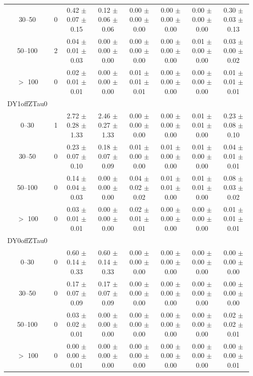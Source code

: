 \begin{table}[htp]
\begin{center}
\begin{tabular}{|c|c|c|ccccc|}
30--50 & 0 & 0.42 $\pm$ 0.07 $\pm$ 0.15 & 0.12 $\pm$ 0.06 $\pm$ 0.06 & 0.00 $\pm$ 0.00 $\pm$ 0.00 & 0.00 $\pm$ 0.00 $\pm$ 0.00 & 0.00 $\pm$ 0.00 $\pm$ 0.00 & 0.30 $\pm$ 0.03 $\pm$ 0.13 \\
50--100 & 2 & 0.04 $\pm$ 0.01 $\pm$ 0.03 & 0.00 $\pm$ 0.00 $\pm$ 0.00 & 0.00 $\pm$ 0.00 $\pm$ 0.00 & 0.00 $\pm$ 0.00 $\pm$ 0.00 & 0.01 $\pm$ 0.00 $\pm$ 0.00 & 0.03 $\pm$ 0.00 $\pm$ 0.02 \\
$>$ 100 & 0 & 0.02 $\pm$ 0.01 $\pm$ 0.01 & 0.00 $\pm$ 0.00 $\pm$ 0.00 & 0.01 $\pm$ 0.01 $\pm$ 0.01 & 0.00 $\pm$ 0.00 $\pm$ 0.00 & 0.00 $\pm$ 0.00 $\pm$ 0.00 & 0.01 $\pm$ 0.01 $\pm$ 0.01 \\
\hline
DY1offZTau0\\
\hline
0--30 & 1 & 2.72 $\pm$ 0.28 $\pm$ 1.33 & 2.46 $\pm$ 0.27 $\pm$ 1.33 & 0.00 $\pm$ 0.00 $\pm$ 0.00 & 0.00 $\pm$ 0.00 $\pm$ 0.00 & 0.01 $\pm$ 0.01 $\pm$ 0.00 & 0.23 $\pm$ 0.08 $\pm$ 0.10 \\
30--50 & 0 & 0.23 $\pm$ 0.07 $\pm$ 0.10 & 0.18 $\pm$ 0.07 $\pm$ 0.09 & 0.01 $\pm$ 0.00 $\pm$ 0.00 & 0.01 $\pm$ 0.00 $\pm$ 0.00 & 0.01 $\pm$ 0.00 $\pm$ 0.00 & 0.04 $\pm$ 0.01 $\pm$ 0.01 \\
50--100 & 0 & 0.14 $\pm$ 0.04 $\pm$ 0.03 & 0.00 $\pm$ 0.00 $\pm$ 0.00 & 0.04 $\pm$ 0.02 $\pm$ 0.02 & 0.01 $\pm$ 0.01 $\pm$ 0.00 & 0.01 $\pm$ 0.01 $\pm$ 0.00 & 0.08 $\pm$ 0.03 $\pm$ 0.02 \\
$>$ 100 & 0 & 0.03 $\pm$ 0.01 $\pm$ 0.01 & 0.00 $\pm$ 0.00 $\pm$ 0.00 & 0.02 $\pm$ 0.01 $\pm$ 0.01 & 0.00 $\pm$ 0.00 $\pm$ 0.00 & 0.00 $\pm$ 0.00 $\pm$ 0.00 & 0.01 $\pm$ 0.01 $\pm$ 0.01 \\
\hline
DY0offZTau0\\
\hline
0--30 & 0 & 0.60 $\pm$ 0.14 $\pm$ 0.33 & 0.60 $\pm$ 0.14 $\pm$ 0.33 & 0.00 $\pm$ 0.00 $\pm$ 0.00 & 0.00 $\pm$ 0.00 $\pm$ 0.00 & 0.00 $\pm$ 0.00 $\pm$ 0.00 & 0.00 $\pm$ 0.00 $\pm$ 0.00 \\
30--50 & 0 & 0.17 $\pm$ 0.07 $\pm$ 0.09 & 0.17 $\pm$ 0.07 $\pm$ 0.09 & 0.00 $\pm$ 0.00 $\pm$ 0.00 & 0.00 $\pm$ 0.00 $\pm$ 0.00 & 0.00 $\pm$ 0.00 $\pm$ 0.00 & 0.00 $\pm$ 0.00 $\pm$ 0.00 \\
50--100 & 0 & 0.03 $\pm$ 0.02 $\pm$ 0.01 & 0.00 $\pm$ 0.00 $\pm$ 0.00 & 0.00 $\pm$ 0.00 $\pm$ 0.00 & 0.00 $\pm$ 0.00 $\pm$ 0.00 & 0.00 $\pm$ 0.00 $\pm$ 0.00 & 0.02 $\pm$ 0.02 $\pm$ 0.01 \\
$>$ 100 & 0 & 0.00 $\pm$ 0.00 $\pm$ 0.01 & 0.00 $\pm$ 0.00 $\pm$ 0.00 & 0.00 $\pm$ 0.00 $\pm$ 0.00 & 0.00 $\pm$ 0.00 $\pm$ 0.00 & 0.00 $\pm$ 0.00 $\pm$ 0.00 & 0.00 $\pm$ 0.00 $\pm$ 0.01 \\

\end{tabular}
\end{center}
\end{table}
